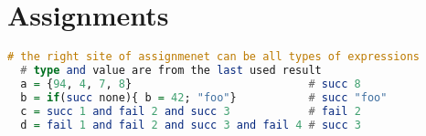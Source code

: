 \chapter{Assignments}

\begin{lstlisting}[language=haskell]
  # the right site of assignmenet can be all types of expressions
  # type and value are from the last used result
  a = {94, 4, 7, 8}                           # succ 8
  b = if(succ none){ b = 42; "foo"}           # succ "foo"
  c = succ 1 and fail 2 and succ 3            # fail 2 
  d = fail 1 and fail 2 and succ 3 and fail 4 # succ 3
\end{lstlisting}
